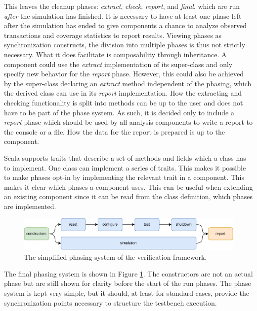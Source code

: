 This leaves the cleanup phases: \textit{extract}, \textit{check}, \textit{report}, and \textit{final}, which are run \textit{after} the simulation has finished. It is necessary
to have at least one phase left after the simulation has ended to give components a chance to analyze observed
transactions and coverage statistics to report results. Viewing phases as synchronization constructs, the
division into multiple phases is thus not strictly necessary. What it does facilitate is composability through
inheritance. A component could use the \textit{extract} implementation of its super-class and only specify new
behavior for the \textit{report} phase. However, this could also be achieved by the super-class declaring an
\textit{extract} method independent of the phasing, which the derived class can use in its \textit{report} implementation. How the extracting and
checking functionality is split into methods can be up to the user and does not have to be part of the phase system.
As such, it is decided only to include a \textit{report} phase which should be used by all analysis components to write a report to the console or a file. How the data for the report is prepared is up to the component.

Scala supports traits that describe a set of methods and fields which a class has to implement. One class can
implement a series of traits. This makes it possible to make phases opt-in by implementing the relevant trait in a
component. This makes it clear which phases a component uses. This can be useful when extending an existing
component since it can be read from the class definition, which phases are implemented.

\begin{figure}
  \centering
  \includegraphics[width=\textwidth]{diagrams/own_phases.pdf}
  \caption{The simplified phasing system of the verification framework.}
  \label{fig:phases}
\end{figure}

The final phasing system is shown in Figure \ref{fig:phases}. The constructors are not an actual phase but are still
shown for clarity before the start of the run phases. The phase system is kept very simple, but it should, at least
for standard cases, provide the synchronization points necessary to structure the testbench execution.

